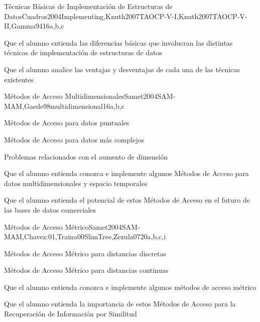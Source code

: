\begin{syllabus}
\begin{unit}{Técnicas Básicas de Implementación de Estructuras de Datos}{Cuadros2004Implementing,Knuth2007TAOCP-V-I,Knuth2007TAOCP-V-II,Gamma94}{16}{a,b,c}
   \begin{unitgoals}
         \item Que el alumno entienda las diferencias básicas que involucran las distintas técnicas de implementación de estructuras de datos
         \item Que el alumno analice las ventajas y desventajas de cada una de las técnicas existentes
   \end{unitgoals}
\end{unit}

\begin{unit}{Métodos de Acceso Multidimensionales}{Samet2004SAM-MAM,Gaede98multidimensional}{16}{a,b,c}
   \begin{topics}
         \item Métodos de Acceso para datos puntuales
         \item Métodos de Acceso para datos más complejos
         \item Problemas relacionados con el aumento de dimensión
   \end{topics}

   \begin{unitgoals}
         \item Que el alumno entienda conozca e implemente algunos Métodos de Acceso para datos multidimensionales y espacio temporales
         \item Que el alumno entienda el potencial de estos Métodos de Acceso en el futuro de las bases de datos comerciales
   \end{unitgoals}
\end{unit}

\begin{unit}{Métodos de Acceso Métrico}{Samet2004SAM-MAM,Chavez:01,Traina00SlimTree,Zezula07}{20}{a,b,c,i}
   \begin{topics}
         \item Métodos de Acceso Métrico para distancias discretas
         \item Métodos de Acceso Métrico para distancias continuas
   \end{topics}

   \begin{unitgoals}
         \item Que el alumno entienda conozca e implemente algunos métodos de acceso métrico
         \item Que el alumno entienda la importancia de estos Métodos de Acceso para la Recuperación de Información por Similitud
   \end{unitgoals}
\end{unit}


\end{syllabus}
